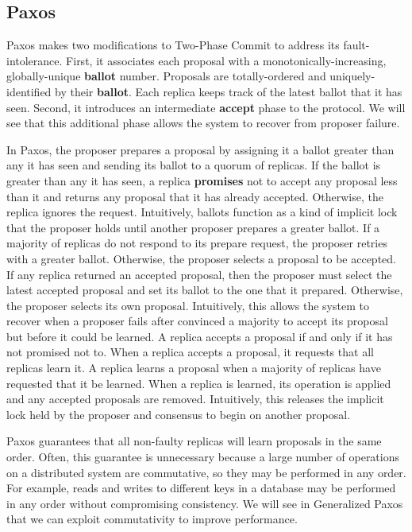 \documentclass{article}
\begin{document}
    \subsection{Paxos}
    Paxos makes two modifications to Two-Phase Commit to address its fault-intolerance. First, it
    associates each proposal with a monotonically-increasing, globally-unique \textbf{ballot} number.
    Proposals are totally-ordered and uniquely-identified by their \textbf{ballot}. Each replica
    keeps track of the latest ballot that it has seen. Second, it introduces an intermediate
    \textbf{accept} phase to the protocol. We will see that this additional phase allows the system to
    recover from proposer failure.~\cite{paxos}

    In Paxos, the proposer prepares a proposal by assigning it a ballot greater than any it has seen
    and sending its ballot to a quorum of replicas. If the ballot is greater than any it has seen, a
    replica \textbf{promises} not to accept any proposal less than it and returns any proposal that it
    has already accepted. Otherwise, the replica ignores the request. Intuitively, ballots function as
    a kind of implicit lock that the proposer holds until another proposer prepares a greater ballot.
    If a majority of replicas do not respond to its prepare request, the proposer retries with a
    greater ballot. Otherwise, the proposer selects a proposal to be accepted. If any replica
    returned an accepted proposal, then the proposer must select the latest accepted proposal and set
    its ballot to the one that it prepared. Otherwise, the proposer selects its own proposal.
    Intuitively, this allows the system to recover when a proposer fails after convinced a
    majority to accept its proposal but before it could be learned. A replica accepts a proposal if
    and only if it has not promised not to. When a replica accepts a proposal, it requests that all
    replicas learn it. A replica learns a proposal when a majority of replicas have requested that it
    be learned. When a replica is learned, its operation is applied and any accepted proposals are
    removed. Intuitively, this releases the implicit lock held by the proposer and consensus to begin
    on another proposal.

    Paxos guarantees that all non-faulty replicas will learn proposals in the same order. Often, this
    guarantee is unnecessary because a large number of operations on a distributed system are
    commutative, so they may be performed in any order. For example, reads and writes to different
    keys in a database may be performed in any order without compromising consistency. We will see in
    Generalized Paxos that we can exploit commutativity to improve performance.
\end{document}
